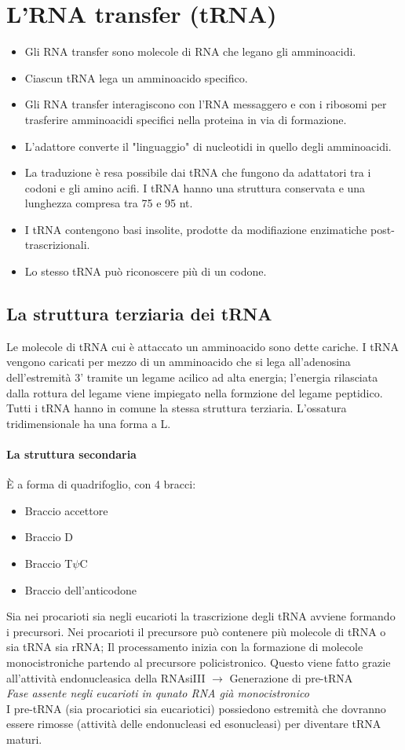 \documentclass{article}
\begin{document}
\section{L'RNA transfer (tRNA)}
\begin{itemize}
    \item Gli RNA transfer sono molecole di RNA che legano gli amminoacidi.
    \item Ciascun tRNA lega un amminoacido specifico.
    \item Gli RNA transfer interagiscono con l'RNA messaggero e con i ribosomi per trasferire amminoacidi specifici nella proteina in via di formazione. 
    \item L'adattore converte il "linguaggio" di nucleotidi in quello degli amminoacidi.
    \item La traduzione è resa possibile dai tRNA che fungono da adattatori tra i codoni e gli amino acifi. I tRNA hanno una struttura conservata e una lunghezza compresa tra 75 e 95 nt.
    \item I tRNA contengono basi insolite, prodotte da modifiazione enzimatiche post-trascrizionali.
    \item Lo stesso tRNA può riconoscere più di un codone.
\end{itemize}
\subsection{La struttura terziaria dei tRNA}
Le molecole di tRNA cui è attaccato un amminoacido sono dette cariche. I tRNA vengono caricati per mezzo di un amminoacido che si lega all'adenosina dell'estremità 3' tramite un legame acilico ad alta energia; 
l'energia rilasciata dalla rottura del legame viene impiegato nella formzione del legame peptidico.\\ Tutti i tRNA hanno in comune la stessa struttura terziaria. L'ossatura tridimensionale ha una forma a L.
\paragraph{La struttura secondaria} È a forma di quadrifoglio, con 4 bracci:
\begin{itemize}
    \item Braccio accettore
    \item Braccio D
    \item Braccio T$\psi$C
    \item Braccio dell'anticodone
\end{itemize}
Sia nei procarioti sia negli eucarioti la trascrizione degli tRNA avviene formando i precursori. Nei procarioti il precursore può contenere più molecole di tRNA o sia tRNA sia rRNA; Il processamento inizia con la formazione di molecole monocistroniche partendo al
precursore policistronico. Questo viene fatto grazie all'attività endonucleasica della
RNAsiIII $\rightarrow$ Generazione di pre-tRNA\\
\textit{Fase assente negli eucarioti in qunato RNA già monocistronico}\\
I pre-tRNA (sia procariotici sia eucariotici) possiedono estremità che dovranno essere rimosse (attività
delle endonucleasi ed esonucleasi) per diventare tRNA maturi.
\end{document}
